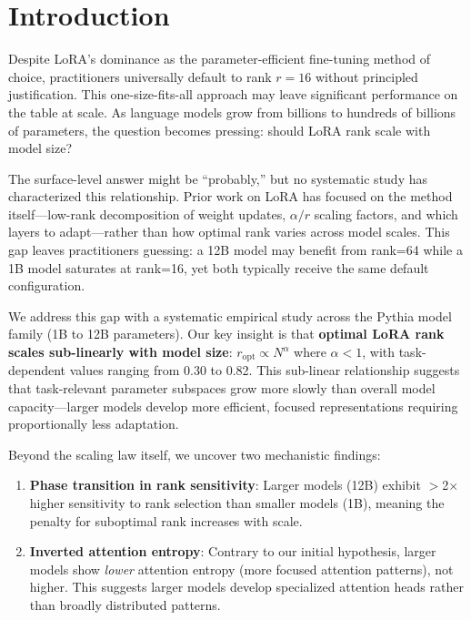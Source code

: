 \section{Introduction}

Despite LoRA's dominance as the parameter-efficient fine-tuning method of choice, practitioners universally default to rank $r=16$ without principled justification. This one-size-fits-all approach may leave significant performance on the table at scale. As language models grow from billions to hundreds of billions of parameters, the question becomes pressing: should LoRA rank scale with model size?

The surface-level answer might be ``probably,'' but no systematic study has characterized this relationship. Prior work on LoRA has focused on the method itself---low-rank decomposition of weight updates, $\alpha/r$ scaling factors, and which layers to adapt---rather than how optimal rank varies across model scales. This gap leaves practitioners guessing: a 12B model may benefit from rank=64 while a 1B model saturates at rank=16, yet both typically receive the same default configuration.

We address this gap with a systematic empirical study across the Pythia model family (1B to 12B parameters). Our key insight is that \textbf{optimal LoRA rank scales sub-linearly with model size}: $r_{\text{opt}} \propto N^\alpha$ where $\alpha < 1$, with task-dependent values ranging from 0.30 to 0.82. This sub-linear relationship suggests that task-relevant parameter subspaces grow more slowly than overall model capacity---larger models develop more efficient, focused representations requiring proportionally less adaptation.

Beyond the scaling law itself, we uncover two mechanistic findings:

\begin{enumerate}
    \item \textbf{Phase transition in rank sensitivity}: Larger models (12B) exhibit $>$2$\times$ higher sensitivity to rank selection than smaller models (1B), meaning the penalty for suboptimal rank increases with scale.
    \item \textbf{Inverted attention entropy}: Contrary to our initial hypothesis, larger models show \emph{lower} attention entropy (more focused attention patterns), not higher. This suggests larger models develop specialized attention heads rather than broadly distributed patterns.
\end{enumerate}

